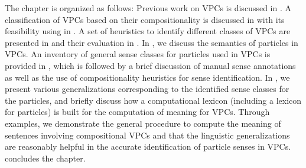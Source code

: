 \documentclass[output=paper,modfonts,nonflat]{langsci/langscibook}
\begin{document}

The chapter is organized as follows: Previous work on VPCs is discussed in . A classification of VPCs based on their compositionality is discussed in  with its feasibility using  in . A set of heuristics to identify different classes of VPCs are presented in  and their evaluation in . In , we discuss the semantics of particles in VPCs. An inventory of general sense classes for particles used in VPCs is provided in , which is followed by a brief discussion of manual sense annotations as well as the use of compositionality heuristics for sense identification. In , we present various generalizations corresponding to the identified sense classes for the particles, and briefly discuss how a computational lexicon (including a lexicon for particles) is built for the computation of meaning for VPCs. Through examples, we demonstrate the general procedure to compute the meaning of sentences involving compositional VPCs and that the linguistic generalizations are reasonably helpful in the accurate identification of particle senses in VPCs.  concludes the chapter.
\end{document}
